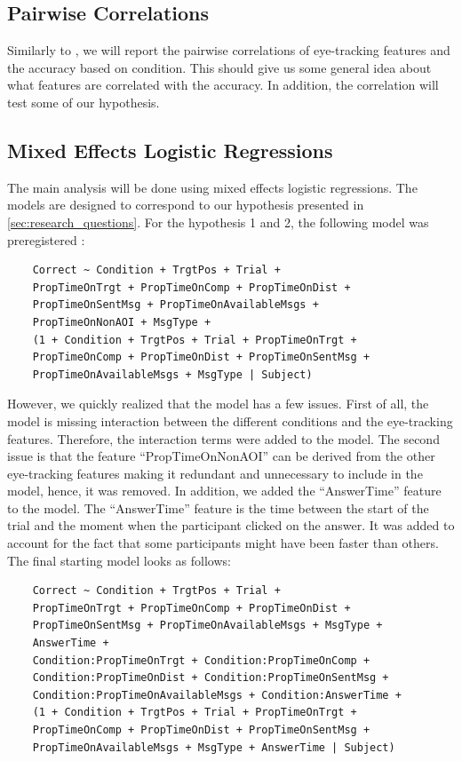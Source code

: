 \subsection{Pairwise Correlations}
\label{sec:analysis:corr}
Similarly to \cite{Vigneau_2006}, we will report the pairwise correlations of eye-tracking features and the accuracy based on condition. This should give us some general idea about what features are correlated with the accuracy. In addition, the correlation will test some of our hypothesis.

\subsection{Mixed Effects Logistic Regressions}
\label{sec:analysis:mixed_effects}

The main analysis will be done using mixed effects logistic regressions. The models are designed to correspond to our hypothesis presented in \autoref{sec:research_questions}. For the hypothesis 1 and 2, the following model was preregistered \citep{preregistration}:
\begin{verbatim}
    Correct ~ Condition + TrgtPos + Trial + 
    PropTimeOnTrgt + PropTimeOnComp + PropTimeOnDist + 
    PropTimeOnSentMsg + PropTimeOnAvailableMsgs + 
    PropTimeOnNonAOI + MsgType +
    (1 + Condition + TrgtPos + Trial + PropTimeOnTrgt + 
    PropTimeOnComp + PropTimeOnDist + PropTimeOnSentMsg + 
    PropTimeOnAvailableMsgs + MsgType | Subject)
\end{verbatim}

However, we quickly realized that the model has a few issues. First of all, the model is missing interaction between the different conditions and the eye-tracking features. Therefore, the interaction terms were added to the model. The second issue is that the feature ``PropTimeOnNonAOI'' can be derived from the other eye-tracking features making it redundant and unnecessary to include in the model, hence, it was removed. In addition, we added the ``AnswerTime'' feature to the model. The ``AnswerTime'' feature is the time between the start of the trial and the moment when the participant clicked on the answer. It was added to account for the fact that some participants might have been faster than others. The final starting model looks as follows:

\begin{verbatim}
    Correct ~ Condition + TrgtPos + Trial + 
    PropTimeOnTrgt + PropTimeOnComp + PropTimeOnDist + 
    PropTimeOnSentMsg + PropTimeOnAvailableMsgs + MsgType +
    AnswerTime +
    Condition:PropTimeOnTrgt + Condition:PropTimeOnComp +
    Condition:PropTimeOnDist + Condition:PropTimeOnSentMsg +
    Condition:PropTimeOnAvailableMsgs + Condition:AnswerTime +
    (1 + Condition + TrgtPos + Trial + PropTimeOnTrgt + 
    PropTimeOnComp + PropTimeOnDist + PropTimeOnSentMsg + 
    PropTimeOnAvailableMsgs + MsgType + AnswerTime | Subject)
\end{verbatim}

